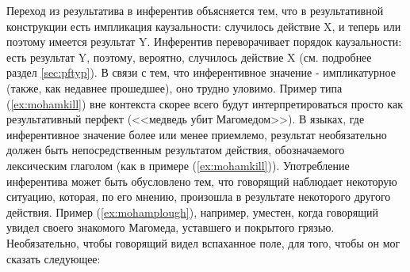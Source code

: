 
Переход из результатива в инферентив объясняется тем, что в результативной конструкции есть импликация каузальности: случилось действие X, и теперь или поэтому имеется результат Y. Инферентив переворачивает порядок каузальности: есть результат Y, поэтому, вероятно, случилось действие X (см. подробнее раздел \ref{sec:pftyp}). В связи с тем, что инферентивное значение - импликатурное (также, как недавнее прошедшее), оно трудно уловимо. Пример типа (\ref{ex:mohamkill}) вне контекста скорее всего будут интерпретироваться просто как результативный перфект (<<медведь убит Магомедом>>). В языках, где инферентивное значение более или менее приемлемо, результат необязательно должен быть непосредственным результатом действия, обозначаемого лексическим глаголом (как в примере (\ref{ex:mohamkill})). Употребление инферентива может быть обусловлено тем, что говорящий наблюдает некоторую ситуацию, которая, по его мнению, произошла в результате некоторого другого действия. Пример (\ref{ex:mohamplough}), например, уместен, когда говорящий увидел своего знакомого Магомеда, уставшего и покрытого грязью. Необязательно, чтобы говорящий видел вспаханное поле, для того, чтобы он мог сказать следующее:


